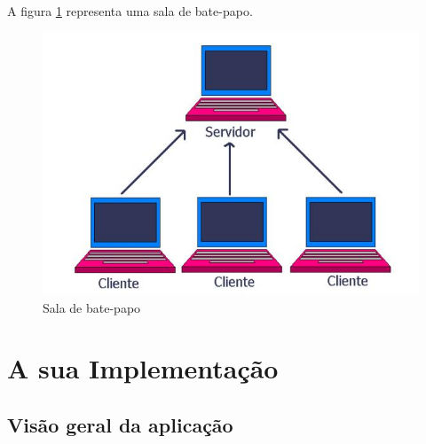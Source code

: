 \documentclass[a4paper,12pt]{article}
\begin{document}
A figura \ref{fig1} representa uma sala de bate-papo.
\begin{figure}[H]
	\centering
	\includegraphics[scale=0.4]{img/clienteservidor.JPG}    
	\caption{Sala de bate-papo}
	\label{fig1}     
\end{figure} 

\section{A sua Implementação}
\subsection{Visão geral da aplicação}
\end{document}
